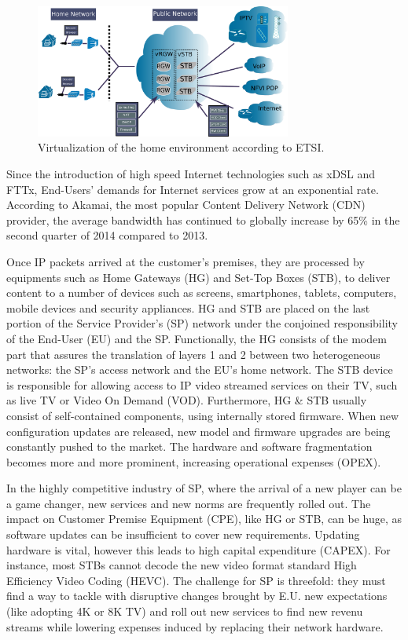 \begin{figure}
  \begin{center}
    \includegraphics[width=0.75\textwidth]{fig/etsi-virtualization-home-env.pdf}
  \end{center}
  \caption{ Virtualization of the home environment according to ETSI.
    \label{fig:etsi-vision}
  }
\end{figure}

Since the introduction of high speed Internet technologies such as xDSL and FTTx, End-Users' demands for Internet services grow at an exponential rate.
According to Akamai, the most popular Content Delivery Network (CDN) provider, the average bandwidth has continued to globally increase by 65\% in the second quarter of 2014 \cite{_akamais_2014} compared to 2013.

Once IP packets arrived at the customer's premises, they are processed by equipments such as Home Gateways (HG) and Set-Top Boxes (STB), to deliver content to a number of devices such as screens, smartphones, tablets, computers, mobile devices and security appliances.
HG and STB are placed on the last portion of the Service Provider's (SP) network under the conjoined responsibility of the End-User (EU) and the SP.
Functionally, the HG consists of the modem part that assures the translation of layers 1 and 2 between two heterogeneous networks: the SP's access network and the EU's home network.
The STB device is responsible for allowing access to IP video streamed services on their TV, such as live TV or Video On Demand (VOD).
Furthermore, HG \& STB usually consist of self-contained components, using internally stored firmware.
When new configuration updates are released, new model and firmware upgrades are being constantly pushed to the market.
The hardware and software fragmentation becomes more and more prominent, increasing operational expenses (OPEX). 

In the highly competitive industry of SP, where the arrival of a new player can be a game changer, new services and new norms are frequently rolled out.	
The impact on Customer Premise Equipment (CPE), like HG or STB, can be huge, as software updates can be insufficient to cover new requirements.
Updating hardware is vital, however this leads to high capital expenditure (CAPEX).
For instance, most STBs cannot decode the new video format standard  High Efficiency Video Coding (HEVC). 
The challenge for SP is threefold: they must find a way to tackle with disruptive changes brought by E.U. new expectations (like adopting 4K or 8K TV) and roll out new services to find new revenu streams while lowering expenses induced by replacing their network hardware.

